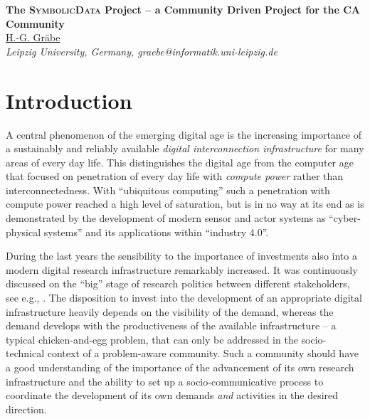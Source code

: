 \documentclass[11pt]{article}
\begin{document}
%
\vspace{-0.8cm}
\begin{flushleft}
\Large \textbf{\noindent
The \textsc{SymbolicData} Project -- a Community Driven Project for the CA
Community}
\\
\vspace{0.5cm}
\normalsize
\normalsize{
 \underline{H.-G. Gr\"abe}
} \\
\vspace{5mm}
\textit{\footnotesize
Leipzig University, Germany, graebe@informatik.uni-leipzig.de\\
}
\end{flushleft}
\newcommand{\SD}{{\sc Symbo\-lic\-Data}}

\section{Introduction}

A central phenomenon of the emerging digital age is the increasing importance
of a sustainably and reliably available \emph{digital interconnection
  infrastructure} for many areas of every day life. This distinguishes the
digital age from the computer age that focused on penetration of every day
life with \emph{compute power} rather than interconnectedness.  With
``ubiquitous computing'' such a penetration with compute power reached a high
level of saturation, but is in no way at its end as is demonstrated by the
development of modern sensor and actor systems as ``cyber-physical systems''
and its applications within ``industry 4.0''. 

During the last years the sensibility to the importance of investments also
into a modern digital research infrastructure remarkably increased. It was
continuously discussed on the ``big'' stage of research politics between
different stakeholders, see e.g., \cite{h2020,esfri}.  The disposition to
invest into the development of an appropriate digital infrastructure heavily
depends on the visibility of the demand, whereas the demand develops with the
productiveness of the available infrastructure -- a typical chicken-and-egg
problem, that can only be addressed in the socio-technical context of a
problem-aware community.  Such a community should have a good understanding of
the importance of the advancement of its own research infrastructure and the
ability to set up a socio-communicative process to coordinate the development
of its own demands \emph{and} activities in the desired direction.
\end{document}
